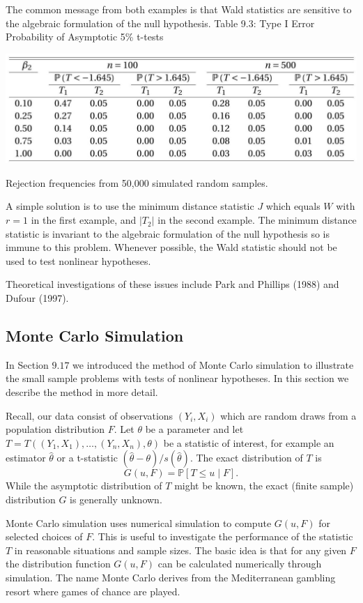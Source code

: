 \documentclass[10pt]{article}
\begin{document}
The common message from both examples is that Wald statistics are sensitive to the algebraic formulation of the null hypothesis. Table 9.3: Type I Error Probability of Asymptotic 5\% t-tests

\includegraphics[max width=\textwidth]{2022_09_17_d22774979aa7978900adg-21}

Rejection frequencies from 50,000 simulated random samples.

A simple solution is to use the minimum distance statistic $J$ which equals $W$ with $r=1$ in the first example, and $\left|T_{2}\right|$ in the second example. The minimum distance statistic is invariant to the algebraic formulation of the null hypothesis so is immune to this problem. Whenever possible, the Wald statistic should not be used to test nonlinear hypotheses.

Theoretical investigations of these issues include Park and Phillips (1988) and Dufour (1997).

\subsection{Monte Carlo Simulation}
In Section $9.17$ we introduced the method of Monte Carlo simulation to illustrate the small sample problems with tests of nonlinear hypotheses. In this section we describe the method in more detail.

Recall, our data consist of observations $\left(Y_{i}, X_{i}\right)$ which are random draws from a population distribution $F$. Let $\theta$ be a parameter and let $T=T\left(\left(Y_{1}, X_{1}\right), \ldots,\left(Y_{n}, X_{n}\right), \theta\right)$ be a statistic of interest, for example an estimator $\widehat{\theta}$ or a t-statistic $(\widehat{\theta}-\theta) / s(\widehat{\theta})$. The exact distribution of $T$ is
$$
G(u, F)=\mathbb{P}[T \leq u \mid F] .
$$
While the asymptotic distribution of $T$ might be known, the exact (finite sample) distribution $G$ is generally unknown.

Monte Carlo simulation uses numerical simulation to compute $G(u, F)$ for selected choices of $F$. This is useful to investigate the performance of the statistic $T$ in reasonable situations and sample sizes. The basic idea is that for any given $F$ the distribution function $G(u, F)$ can be calculated numerically through simulation. The name Monte Carlo derives from the Mediterranean gambling resort where games of chance are played.
\end{document}
